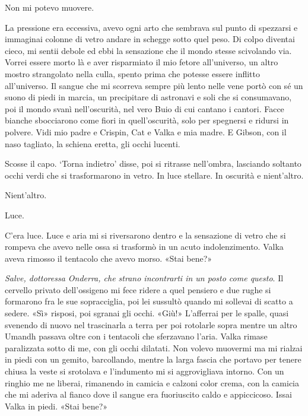 Non mi potevo muovere.

La pressione era eccessiva, avevo ogni arto che sembrava sul punto di
spezzarsi e immaginai colonne di vetro andare in schegge sotto quel
peso. Di colpo diventai cieco, mi sentii debole ed ebbi la sensazione
che il mondo stesse scivolando via. Vorrei essere morto là e aver
risparmiato il mio fetore all'universo, un altro mostro strangolato
nella culla, spento prima che potesse essere inflitto all'universo. Il
sangue che mi scorreva sempre più lento nelle vene portò con sé un suono
di piedi in marcia, un precipitare di astronavi e soli che si
consumavano, poi il mondo svanì nell'oscurità, nel vero Buio di cui
cantano i cantori. Facce bianche sbocciarono come fiori in
quell'oscurità, solo per spegnersi e ridursi in polvere. Vidi mio padre
e Crispin, Cat e Valka e mia madre. E Gibson, con il naso tagliato, la
schiena eretta, gli occhi lucenti.

Scosse il capo. `Torna indietro' disse, poi si ritrasse nell'ombra,
lasciando soltanto occhi verdi che si trasformarono in vetro. In luce
stellare. In oscurità e nient'altro.

Nient'altro.

\begin{figure}
	\centering
	\def\svgwidth{\columnwidth}
	\scalebox{0.2}{}
\end{figure}

Luce.

C'era luce. Luce e aria mi si riversarono dentro e la sensazione di
vetro che si rompeva che avevo nelle ossa si trasformò in un acuto
indolenzimento. Valka aveva rimosso il tentacolo che avevo morso. «Stai
bene?»

\emph{Salve, dottoressa Onderra, che strano incontrarti in un posto come
	questo}. Il cervello privato dell'ossigeno mi fece ridere a quel
pensiero e due rughe si formarono fra le sue sopracciglia, poi lei
sussultò quando mi sollevai di scatto a sedere. «Sì» risposi, poi
sgranai gli occhi. «Giù!» L'afferrai per le spalle, quasi svenendo di
nuovo nel trascinarla a terra per poi rotolarle sopra mentre un altro
Umandh passava oltre con i tentacoli che sferzavano l'aria. Valka rimase
paralizzata sotto di me, con gli occhi dilatati. Non volevo muovermi ma
mi rialzai in piedi con un gemito, barcollando, mentre la larga fascia
che portavo per tenere chiusa la veste si srotolava e l'indumento mi si
aggrovigliava intorno. Con un ringhio me ne liberai, rimanendo in
camicia e calzoni color crema, con la camicia che mi aderiva al fianco
dove il sangue era fuoriuscito caldo e appiccicoso. Issai Valka in
piedi. «Stai bene?»

